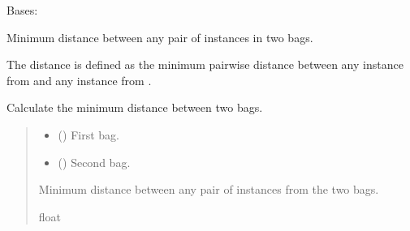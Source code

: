 \documentclass[letterpaper,10pt,english]{sphinxmanual}
\begin{document}
\begin{fulllineitems}
\label{\detokenize{core/index:miml.core.minimal_hausdorff.MinimalHausdorff}}
\pysigstartsignatures
\pysigline
{}
\pysigstopsignatures
\sphinxAtStartPar
Bases: {\hyperref[\detokenize{core/index:miml.core.hausdorff_distance.HausdorffDistance}]{}}

\sphinxAtStartPar
Minimum distance between any pair of instances in two bags.

\sphinxAtStartPar
The distance is defined as the minimum pairwise distance between
any instance from  and any instance from .

\begin{fulllineitems}
\label{\detokenize{core/index:miml.core.minimal_hausdorff.MinimalHausdorff.distance}}
\pysigstartsignatures
\pysiglinewithargsret
{}
{\sphinxparamcomma {}}
{}
\pysigstopsignatures
\sphinxAtStartPar
Calculate the minimum distance between two bags.
\begin{quote}\begin{description}
\begin{itemize}
\item {} 
\sphinxAtStartPar
{} ({\hyperref[\detokenize{data/_autosummary/miml.data.bag.Bag:miml.data.bag.Bag}]{}}) \textendash{} First bag.

\item {} 
\sphinxAtStartPar
{} ({\hyperref[\detokenize{data/_autosummary/miml.data.bag.Bag:miml.data.bag.Bag}]{}}) \textendash{} Second bag.

\end{itemize}

\sphinxAtStartPar
Minimum distance between any pair of instances from the
two bags.

\sphinxAtStartPar
float

\end{description}\end{quote}

\end{fulllineitems}


\end{fulllineitems}
\end{document}
